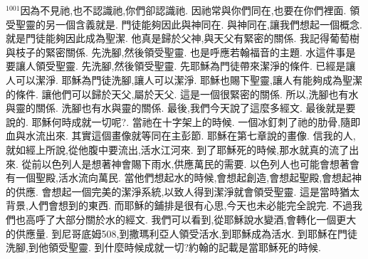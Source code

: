 \documentclass{book}
\begin{document}
$^{1001}$因為不見祂,也不認識祂,你們卻認識祂.
因祂常與你們同在,也要在你們裡面.
領受聖靈的另一個含義就是.
門徒能夠因此與神同在.
與神同在,讓我們想起一個概念.
就是門徒能夠因此成為聖潔.
他真是歸於父神,與天父有緊密的關係.
我記得葡萄樹與枝子的緊密關係.
先洗腳,然後領受聖靈.
也是呼應若翰福音的主題.
水這件事是要讓人領受聖靈.
先洗腳,然後領受聖靈.
先耶穌為門徒帶來潔淨的條件.
已經是讓人可以潔淨.
耶穌為門徒洗腳,讓人可以潔淨.
耶穌也賜下聖靈,讓人有能夠成為聖潔的條件.
讓他們可以歸於天父,屬於天父.
這是一個很緊密的關係.
所以,洗腳也有水與靈的關係.
洗腳也有水與靈的關係.
最後,我們今天說了這麼多經文.
最後就是要說的.
耶穌何時成就一切呢?.
當祂在十字架上的時候.
一個冰釘刺了祂的肋骨,隨即血與水流出來.
其實這個畫像就等同在主彭節.
耶穌在第七章說的畫像.
信我的人,就如經上所說,從他腹中要流出,活水江河來.
到了耶穌死的時候,那水就真的流了出來.
從前以色列人是想著神會賜下雨水,供應萬民的需要.
以色列人也可能會想著會有一個聖殿,活水流向萬民.
當他們想起水的時候,會想起創造,會想起聖殿,會想起神的供應.
會想起一個完美的潔淨系統,以致人得到潔淨就會領受聖靈.
這是當時猶太背景,人們會想到的東西.
而耶穌的鋪排是很有心思,今天也未必能完全說完.
不過我們也高呼了大部分關於水的經文.
我們可以看到,從耶穌說水變酒,會轉化一個更大的供應量.
到尼哥底姆508,到撒瑪利亞人領受活水,到耶穌成為活水.
到耶穌在門徒洗腳,到他領受聖靈.
到什麼時候成就一切?約翰的記載是當耶穌死的時候.
\end{document}
